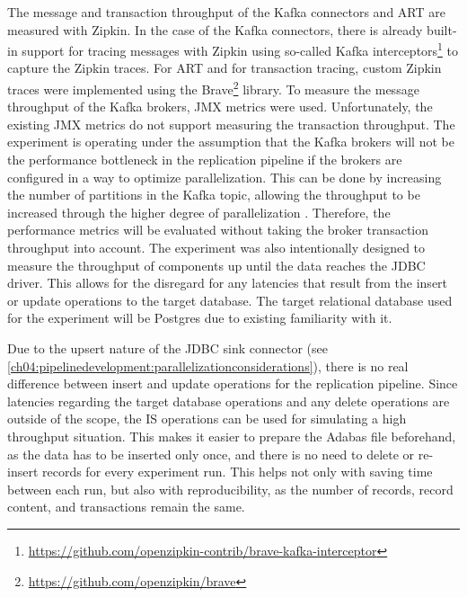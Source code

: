 The message and transaction throughput of the Kafka connectors and \ac{ART} are measured with Zipkin. In the case of the Kafka connectors, there is already built-in support for tracing messages with Zipkin using so-called Kafka interceptors\footnote{\url{https://github.com/openzipkin-contrib/brave-kafka-interceptor}} to capture the Zipkin traces. For \ac{ART} and for transaction tracing, custom Zipkin traces were implemented using the Brave\footnote{\url{https://github.com/openzipkin/brave}} library. To measure the message throughput of the Kafka brokers, \ac{JMX} metrics were used. Unfortunately, the existing \ac{JMX} metrics do not support measuring the transaction throughput. The experiment is operating under the assumption that the Kafka brokers will not be the performance bottleneck in the replication pipeline if the brokers are configured in a way to optimize parallelization. This can be done by increasing the number of partitions in the Kafka topic, allowing the throughput to be increased through the higher degree of parallelization \cite{cerezo2021analysisparallelism}. Therefore, the performance metrics will be evaluated without taking the broker transaction throughput into account.
The experiment was also intentionally designed to measure the throughput of components up until the data reaches the \ac{JDBC} driver. This allows for the disregard for any latencies that result from the insert or update operations to the target database. The target relational database used for the experiment will be Postgres due to existing familiarity with it.

Due to the upsert nature of the \ac{JDBC} sink connector (see \ref{ch04:pipelinedevelopment:parallelizationconsiderations}), there is no real difference between insert and update operations for the replication pipeline. Since latencies regarding the target database operations and any delete operations are outside of the scope, the \ac{IS} operations can be used for simulating a high throughput situation. This makes it easier to prepare the Adabas file beforehand, as the data has to be inserted only once, and there is no need to delete or re-insert records for every experiment run. This helps not only with saving time between each run, but also with reproducibility, as the number of records, record content, and transactions remain the same.

